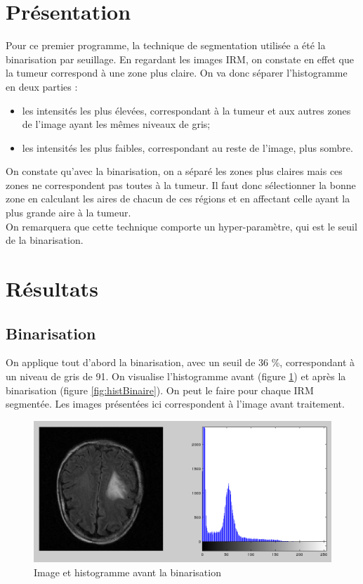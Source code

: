 \section{Présentation} %
\label{sub:pr_sentation}
	Pour ce premier programme, la technique de segmentation utilisée a été la binarisation par seuillage. En regardant les images IRM, on constate en effet que la tumeur correspond à une zone plus claire. On va donc séparer l'histogramme en deux parties :\\
	\begin{itemize}

		\item les intensités les plus élevées, correspondant à la tumeur et aux autres zones de l'image ayant les mêmes niveaux de gris;
		\item les intensités les plus faibles, correspondant au reste de l'image, plus sombre.
	\end{itemize}
	\bigskip

	On constate qu'avec la binarisation, on a séparé les zones plus claires mais ces zones ne correspondent pas toutes à la tumeur. Il faut donc sélectionner la bonne zone en calculant les aires de chacun de ces régions et en affectant celle ayant la plus grande aire à la tumeur.\\

	On remarquera que cette technique comporte un hyper-paramètre, qui est le seuil de la binarisation.


\section{Résultats}
	\subsection{Binarisation} %
	\label{ssub:binarisation}
		On applique tout d'abord la binarisation, avec un seuil de 36 \%, correspondant à un niveau de gris de 91. On visualise l'histogramme avant (figure \ref{fig:hist}) et après la binarisation (figure \ref{fig:histBinaire}). On peut le faire pour chaque IRM segmentée. Les images présentées ici correspondent à l'image avant traitement.

		\begin{figure}[H]
			\centering
			\includegraphics[width=\textwidth]{images/1-hist.png}
			\caption{Image et histogramme avant la binarisation}
			\label{fig:hist}
		\end{figure}


